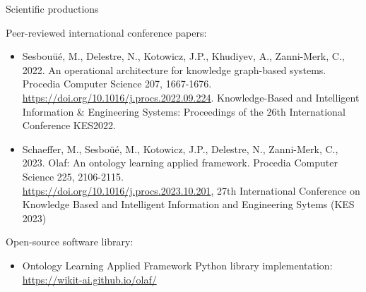 \begin{frame}{Scientific productions}

    Peer-reviewed international conference papers:
    \begin{itemize}
        \item Sesbouüé, M., Delestre, N., Kotowicz, J.P., Khudiyev, A., Zanni-Merk, C., 2022. An operational architecture for knowledge graph-based systems. Procedia Computer Science 207, 1667-1676. \href{https://doi.org/10.1016/j.procs.2022.09.224}{https://doi.org/10.1016/j.procs.2022.09.224}. Knowledge-Based and Intelligent Information \& Engineering Systems: Proceedings of the 26th International Conference KES2022.
        \item  Schaeffer, M., Sesboüé, M., Kotowicz, J.P., Delestre, N., Zanni-Merk, C., 2023. Olaf: An ontology learning applied framework. Procedia Computer Science 225, 2106-2115. \\ \href{https://doi.org/10.1016/j.procs.2023.10.201}{https://doi.org/10.1016/j.procs.2023.10.201}, 27th International Conference on Knowledge Based and Intelligent Information and Engineering Sytems (KES 2023)
    \end{itemize}

    Open-source software library:
    \begin{itemize}
        \item Ontology Learning Applied Framework Python library implementation:\\\href{https://wikit-ai.github.io/olaf/}{https://wikit-ai.github.io/olaf/}
    \end{itemize}

\end{frame}